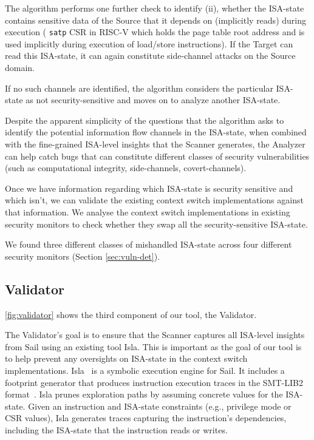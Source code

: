 The algorithm performs one further check to identify (ii), \ie{} whether the ISA-state contains sensitive data of the Source that it depends on (implicitly reads) during execution (\eg{} \texttt{satp} CSR in RISC-V which holds the page table root address and is used implicitly during execution of load/store instructions).
If the Target can read this ISA-state, it can again constitute side-channel attacks on the Source domain.

If no such channels are identified, the algorithm considers the particular ISA-state as not security-sensitive and moves on to analyze another ISA-state. 

Despite the apparent simplicity of the questions that the algorithm asks to identify the potential information flow channels in the ISA-state, when combined with the fine-grained ISA-level insights that the Scanner generates, the Analyzer can help catch bugs that can constitute different classes of security vulnerabilities (such as computational integrity, side-channels, covert-channels).  

Once we have information regarding which ISA-state is security sensitive and which isn't, we can validate the existing context switch implementations against that information. 
We analyse the context switch implementations in existing security monitors to check whether they swap all the security-sensitive ISA-state.

We found three different classes of mishandled ISA-state across four different security monitors (Section \ref{sec:vuln-det}). 



\subsection{Validator} 

\autoref{fig:validator} shows the third component of our tool, the Validator. 

 

The Validator's goal is to ensure that the Scanner captures all ISA-level insights from Sail using an existing tool Isla.
This is important as the goal of our tool is to help prevent any oversights on ISA-state in the context switch implementations.
Isla~\cite{isla} is a symbolic execution engine for Sail. It includes a footprint generator that produces instruction execution traces in the SMT-LIB2 format~\cite{smtlib2}.
Isla prunes exploration paths by assuming concrete values for the ISA-state.
Given an instruction and ISA-state constraints (e.g., privilege mode or CSR values), Isla generates traces capturing the instruction's dependencies, including the ISA-state that the instruction reads or writes.




